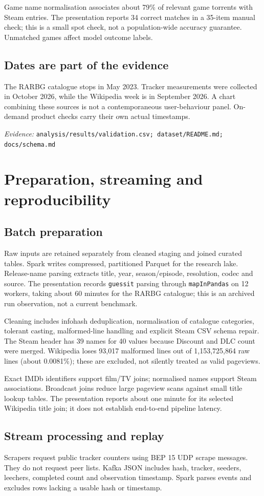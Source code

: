 \documentclass[11pt,a4paper]{article}
\newcommand{\code}[1]{{\small\nolinkurl{#1}}}
\newcommand{\source}[1]{{\footnotesize\textit{Evidence:} \code{#1}\par}}
\newcommand{\chapterpage}[1]{\clearpage\section{#1}}
\begin{document}
Game name normalisation associates about 79\% of relevant game torrents
with Steam entries. The presentation reports 34 correct matches in a
35-item manual check; this is a small spot check, not a population-wide
accuracy guarantee. Unmatched games affect model outcome labels.

\subsection{Dates are part of the evidence}
The RARBG catalogue stops in May 2023. Tracker measurements were collected
in October 2026, while the Wikipedia week is in September 2026. A chart
combining these sources is not a contemporaneous user-behaviour panel.
On-demand product checks carry their own actual timestamps.

\source{analysis/results/validation.csv; dataset/README.md; docs/schema.md}

\chapterpage{Preparation, streaming and reproducibility}
\subsection{Batch preparation}
Raw inputs are retained separately from cleaned staging and joined curated
tables. Spark writes compressed, partitioned Parquet for the research lake.
Release-name parsing extracts title, year, season/episode, resolution,
codec and source. The presentation records \code{guessit} parsing through
\code{mapInPandas} on 12 workers, taking about 60 minutes for the RARBG
catalogue; this is an archived run observation, not a current benchmark.

Cleaning includes infohash deduplication, normalisation of catalogue
categories, tolerant casting, malformed-line handling and explicit Steam
CSV schema repair. The Steam header has 39 names for 40 values because
Discount and DLC count were merged. Wikipedia loses 93,017 malformed lines
out of 1,153,725,864 raw lines (about 0.0081\%); these are excluded, not
silently treated as valid pageviews.

Exact IMDb identifiers support film/TV joins; normalised names support
Steam associations. Broadcast joins reduce large pageview scans against
small title lookup tables. The presentation reports about one minute for
its selected Wikipedia title join; it does not establish end-to-end
pipeline latency.

\subsection{Stream processing and replay}
Scrapers request public tracker counters using BEP 15 UDP scrape messages.
They do not request peer lists. Kafka JSON includes hash, tracker, seeders,
leechers, completed count and observation timestamp. Spark parses events
and excludes rows lacking a usable hash or timestamp.
\end{document}

